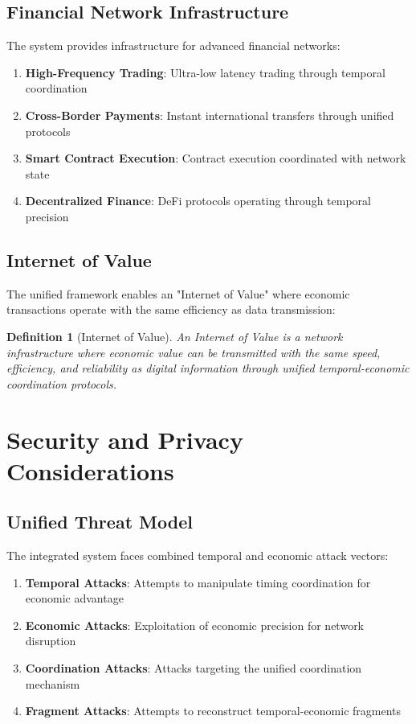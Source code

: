 \documentclass[12pt,a4paper]{article}
\newtheorem{definition}[theorem]{Definition}
\begin{document}
\subsection{Financial Network Infrastructure}

The system provides infrastructure for advanced financial networks:

\begin{enumerate}
\item \textbf{High-Frequency Trading}: Ultra-low latency trading through temporal coordination
\item \textbf{Cross-Border Payments}: Instant international transfers through unified protocols
\item \textbf{Smart Contract Execution}: Contract execution coordinated with network state
\item \textbf{Decentralized Finance}: DeFi protocols operating through temporal precision
\end{enumerate}

\subsection{Internet of Value}

The unified framework enables an "Internet of Value" where economic transactions operate with the same efficiency as data transmission:

\begin{definition}[Internet of Value]
An Internet of Value is a network infrastructure where economic value can be transmitted with the same speed, efficiency, and reliability as digital information through unified temporal-economic coordination protocols.
\end{definition}

\section{Security and Privacy Considerations}

\subsection{Unified Threat Model}

The integrated system faces combined temporal and economic attack vectors:

\begin{enumerate}
\item \textbf{Temporal Attacks}: Attempts to manipulate timing coordination for economic advantage
\item \textbf{Economic Attacks}: Exploitation of economic precision for network disruption
\item \textbf{Coordination Attacks}: Attacks targeting the unified coordination mechanism
\item \textbf{Fragment Attacks}: Attempts to reconstruct temporal-economic fragments
\end{enumerate}
\end{document}
